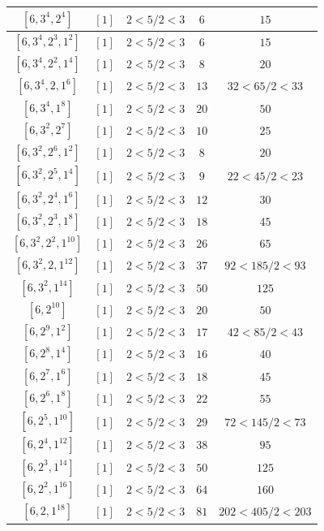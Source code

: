 \documentclass{article}%
\begin{document}
\begin{center}
\begin{longtable}{||c|c|c|c|c||}
$[6, 3^{4}, 2^{4}]$ & $[1]$ & $2 < 5/2 < 3$ & $6$ & $15$ \\ \hline 
$[6, 3^{4}, 2^{3}, 1^{2}]$ & $[1]$ & $2 < 5/2 < 3$ & $6$ & $15$ \\ \hline 
$[6, 3^{4}, 2^{2}, 1^{4}]$ & $[1]$ & $2 < 5/2 < 3$ & $8$ & $20$ \\ \hline 
$[6, 3^{4}, 2, 1^{6}]$ & $[1]$ & $2 < 5/2 < 3$ & $13$ & $32 < 65/2 < 33$ \\ \hline 
$[6, 3^{4}, 1^{8}]$ & $[1]$ & $2 < 5/2 < 3$ & $20$ & $50$ \\ \hline 
$[6, 3^{2}, 2^{7}]$ & $[1]$ & $2 < 5/2 < 3$ & $10$ & $25$ \\ \hline 
$[6, 3^{2}, 2^{6}, 1^{2}]$ & $[1]$ & $2 < 5/2 < 3$ & $8$ & $20$ \\ \hline 
$[6, 3^{2}, 2^{5}, 1^{4}]$ & $[1]$ & $2 < 5/2 < 3$ & $9$ & $22 < 45/2 < 23$ \\ \hline 
$[6, 3^{2}, 2^{4}, 1^{6}]$ & $[1]$ & $2 < 5/2 < 3$ & $12$ & $30$ \\ \hline 
$[6, 3^{2}, 2^{3}, 1^{8}]$ & $[1]$ & $2 < 5/2 < 3$ & $18$ & $45$ \\ \hline 
$[6, 3^{2}, 2^{2}, 1^{10}]$ & $[1]$ & $2 < 5/2 < 3$ & $26$ & $65$ \\ \hline 
$[6, 3^{2}, 2, 1^{12}]$ & $[1]$ & $2 < 5/2 < 3$ & $37$ & $92 < 185/2 < 93$ \\ \hline 
$[6, 3^{2}, 1^{14}]$ & $[1]$ & $2 < 5/2 < 3$ & $50$ & $125$ \\ \hline 
$[6, 2^{10}]$ & $[1]$ & $2 < 5/2 < 3$ & $20$ & $50$ \\ \hline 
$[6, 2^{9}, 1^{2}]$ & $[1]$ & $2 < 5/2 < 3$ & $17$ & $42 < 85/2 < 43$ \\ \hline 
$[6, 2^{8}, 1^{4}]$ & $[1]$ & $2 < 5/2 < 3$ & $16$ & $40$ \\ \hline 
$[6, 2^{7}, 1^{6}]$ & $[1]$ & $2 < 5/2 < 3$ & $18$ & $45$ \\ \hline 
$[6, 2^{6}, 1^{8}]$ & $[1]$ & $2 < 5/2 < 3$ & $22$ & $55$ \\ \hline 
$[6, 2^{5}, 1^{10}]$ & $[1]$ & $2 < 5/2 < 3$ & $29$ & $72 < 145/2 < 73$ \\ \hline 
$[6, 2^{4}, 1^{12}]$ & $[1]$ & $2 < 5/2 < 3$ & $38$ & $95$ \\ \hline 
$[6, 2^{3}, 1^{14}]$ & $[1]$ & $2 < 5/2 < 3$ & $50$ & $125$ \\ \hline 
$[6, 2^{2}, 1^{16}]$ & $[1]$ & $2 < 5/2 < 3$ & $64$ & $160$ \\ \hline 
$[6, 2, 1^{18}]$ & $[1]$ & $2 < 5/2 < 3$ & $81$ & $202 < 405/2 < 203$ \\ \hline 

\end{longtable}
\end{center}
\end{document}
